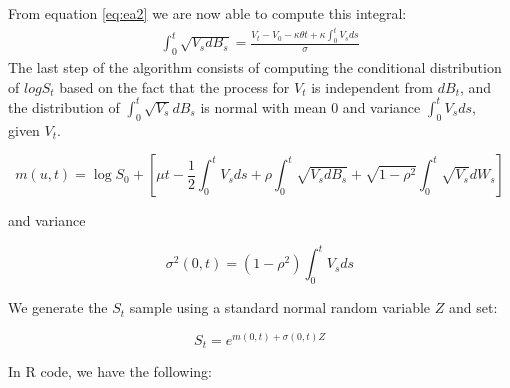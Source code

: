 \documentclass[12pt,twoside]{reedthesis}
\theoremstyle{definition}
\theoremstyle{definition}
\theoremstyle{remark}
\begin{document}
  From equation \eqref{eq:ea2} we are now able to compute this integral:
  \begin{align} \label{eq:ea3}
  \int_{0}^{t}{\sqrt{V_s dB_s}} = \frac{V_t - V_0 - \kappa \theta t + \kappa \int_{0}^{t}{V_s ds}}{\sigma} 
  \end{align}
  The last step of the algorithm consists of computing the conditional
  distribution of \(log S_t\) based on the fact that the process for
  \(V_t\) is independent from \(dB_t\), and the distribution of
  \(\displaystyle \int_0^t{\sqrt{V_s} dB_s}\) is normal with mean \(0\)
  and variance \(\displaystyle \int_0^t{V_s ds}\), given \(V_t\).
  
  \[m(u,t) = \log S_0 + \left[ \mu t - \frac{1}{2} \int_{0}^{t}{V_s ds} + \rho  \int_{0}^{t}{\sqrt{V_s d B_s}} + \sqrt{1 - \rho^2} \int_{0}^{t}{\sqrt{V_s} dW_s}\right]\]
  
  and variance
  
  \[\sigma^2(0,t) = \left( 1 - \rho^2 \right) \int_0^t{V_s ds}\]
  
  We generate the \(S_t\) sample using a standard normal random variable
  \(Z\) and set:
  
  \[S_t = e^{m(0,t) + \sigma (0,t) Z}\]
  
  In R code, we have the following:
  \begin{Shaded}
  \begin{Highlighting}[]
  \StringTok{ }\NormalTok{(}\OperatorTok{/}\OperatorTok{*}\StringTok{ }\OperatorTok{-}\StringTok{ }\OperatorTok{-}\StringTok{ }\OperatorTok{*}\StringTok{ }\OperatorTok{*}\StringTok{ }\OperatorTok{+}\StringTok{ }\OperatorTok{*}\StringTok{ }
    
  \StringTok{ }\OperatorTok{+}\StringTok{ }\OperatorTok{*}\StringTok{ }\OperatorTok{-}\StringTok{ }\OperatorTok{-}\StringTok{ }\NormalTok{(}\OperatorTok{/}\NormalTok{) }\OperatorTok{*}\StringTok{ }\OperatorTok{+}\StringTok{ }\OperatorTok{*}\StringTok{ }
  \StringTok{ }\NormalTok{((} \OperatorTok{-}\StringTok{ }\OperatorTok{^}\NormalTok{)) }\OperatorTok{*}\StringTok{ }
  \StringTok{ }\OperatorTok{+}\StringTok{ }\OperatorTok{*}\StringTok{ }\OperatorTok{::}\NormalTok{(}\NormalTok{))}
  \end{Highlighting}
  \end{Shaded}
\end{document}
